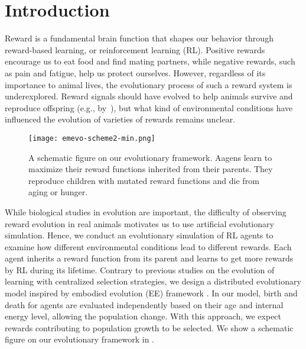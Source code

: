 \section{Introduction}\label{sec:intro}
Reward is a fundamental brain function that shapes our behavior through reward-based learning, or reinforcement learning (RL). Positive rewards encourage us to eat food and find mating partners, while negative rewards, such as pain and fatigue, help us protect ourselves. However, regardless of its importance to animal lives, the evolutionary process of such a reward system is underexplored. Reward signals should have evolved to help animals survive and reproduce offspring (e.g., by~\cite{schultzNeuronalRewardDecision2015}), but what kind of environmental conditions have influenced the evolution of varieties of rewards remains unclear.

\begin{figure}[t]
  \centering{}
  \texttt{[image: emevo-scheme2-min.png]}
  \caption{
    A schematic figure on our evolutionary framework.
    Aagens learn to maximize their reward functions inherited from their parents.
    They reproduce children with mutated reward functions and die from aging or hunger.
  }\label{figure:scheme}
\end{figure}


While biological studies in evolution are important, the difficulty of observing reward evolution in real animals motivates us to use artificial evolutionary simulation. Hence, we conduct an evolutionary simulation of RL agents to examine how different environmental conditions lead to different rewards. Each agent inherits a reward function from its parent and learns to get more rewards by RL during its lifetime. Contrary to previous studies on the evolution of learning \citep{hintonHowLearningCan1987,singhWhereRewardsCome2009} with centralized selection strategies, we design a distributed evolutionary model inspired by embodied evolution (EE) framework \citep{watsonEmbodiedEvolutionDistributing2002,bredecheEmbodiedEvolutionCollective2018}. In our model, birth and death for agents are evaluated independently based on their age and internal energy level, allowing the population change. With this approach, we expect rewards contributing to population growth to be selected. We show a schematic figure on our evolutionary framework in .


